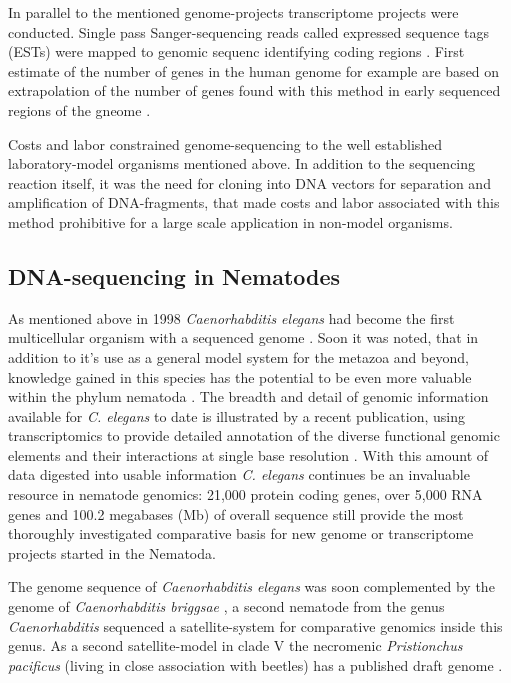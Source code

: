 In parallel to the mentioned genome-projects transcriptome projects
were conducted. Single pass Sanger-sequencing reads called expressed
sequence tags (ESTs) were mapped to genomic sequenc identifying coding
regions \cite{pmid2047873}. First estimate of the number of genes in
the human genome for example are based on extrapolation of the number
of genes found with this method in early sequenced regions of the
gneome \cite{pmid7920649}.

Costs and labor constrained genome-sequencing to the well established
laboratory-model organisms mentioned above. In addition to the
sequencing reaction itself, it was the need for cloning into DNA
vectors for separation and amplification of DNA-fragments, that made
costs and labor associated with this method prohibitive for a large
scale application in non-model organisms.

\subsection{DNA-sequencing in Nematodes}
\label{sec:dna-sequ-nemat}

As mentioned above in 1998 \textit{Caenorhabditis elegans} had become
the first multicellular organism with a sequenced genome
\cite{pmid9851916}. Soon it was noted, that in addition to it's use as
a general model system for the metazoa and beyond, knowledge gained in
this species has the potential to be even more valuable within the
phylum nematoda \cite{blaxter_caenorhabditis_1998}. The breadth and
detail of genomic information available for \textit{C. elegans} to
date is illustrated by a recent publication, using transcriptomics to
provide detailed annotation of the diverse functional genomic elements
and their interactions at single base resolution
\cite{pmid21177976}. With this amount of data digested into usable
information \textit{C. elegans} continues be an invaluable resource in
nematode genomics: 21,000 protein coding genes, over 5,000 RNA genes
and 100.2 megabases (Mb) of overall sequence still provide the most
thoroughly investigated comparative basis for new genome or
transcriptome projects started in the Nematoda.

The genome sequence of \textit{Caenorhabditis elegans} was soon
complemented by the genome of \textit{Caenorhabditis briggsae}
\cite{stein_genome_2003}, a second nematode from the genus
\textit{Caenorhabditis} sequenced a satellite-system for comparative
genomics inside this genus. As a second satellite-model in clade V the
necromenic \textit{Pristionchus pacificus} (living in close
association with beetles) has a published draft genome
\cite{pmid18806794}.

